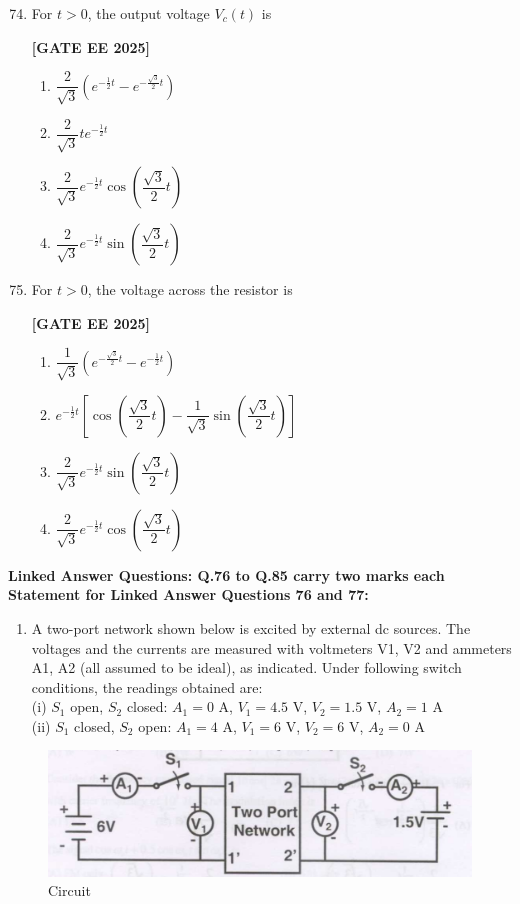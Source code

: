 \documentclass[12pt]{article}
\begin{document}
\begin{enumerate}[leftmargin=*, label=\textbf{Q.\arabic*:}]
\setcounter{enumi}{73}

\item For $t>0$, the output voltage $V_c(t)$ is
 
\noindent \textbf{[GATE EE 2025]}
\begin{enumerate}
  \item $\dfrac{2}{\sqrt{3}}\left(e^{-\frac{1}{2}t} - e^{-\frac{\sqrt{3}}{2}t}\right)$
  \item $\dfrac{2}{\sqrt{3}} t e^{-\frac{1}{2} t}$
  \item $\dfrac{2}{\sqrt{3}} e^{-\frac{1}{2} t} \cos\left( \dfrac{\sqrt{3}}{2} t \right)$
  \item $\dfrac{2}{\sqrt{3}} e^{-\frac{1}{2} t} \sin\left( \dfrac{\sqrt{3}}{2} t \right)$
\end{enumerate}

\item For $t>0$, the voltage across the resistor is
 
\noindent \textbf{[GATE EE 2025]}
\begin{enumerate}
  \item $\dfrac{1}{\sqrt{3}} \left( e^{-\frac{\sqrt{3}}{2} t} - e^{-\frac{1}{2} t} \right)$
  \item $e^{-\frac{1}{2} t} \left[ \cos \left( \dfrac{\sqrt{3}}{2} t \right) - \dfrac{1}{\sqrt{3}} \sin \left( \dfrac{\sqrt{3}}{2} t \right) \right]$
  \item $\dfrac{2}{\sqrt{3}} e^{-\frac{1}{2} t} \sin \left( \dfrac{\sqrt{3}}{2} t \right)$
  \item $\dfrac{2}{\sqrt{3}} e^{-\frac{1}{2} t} \cos \left( \dfrac{\sqrt{3}}{2} t \right)$
\end{enumerate}

\end{enumerate}


 \large \textbf {Linked Answer Questions: Q.76 to Q.85 carry two marks each}
 \large \textbf {Statement for Linked Answer Questions 76 and 77: }

\begin{enumerate}
\item A two-port network shown below is excited by external dc sources. The voltages and the currents are measured with voltmeters V1, V2 and ammeters A1, A2 (all assumed to be ideal), as indicated. Under following switch conditions, the readings obtained are: \\
(i) $S_1$ open, $S_2$ closed: $A_1=0$ A, $V_1=4.5$ V, $V_2=1.5$ V, $A_2=1$ A \\
(ii) $S_1$ closed, $S_2$ open: $A_1=4$ A, $V_1=6$ V, $V_2=6$ V, $A_2=0$ A
\end{enumerate}
\begin{figure}[H]\centering
\includegraphics[width=0.6\columnwidth]{figs/q7677.png}
\caption{Circuit}
\label{fig:q7677}
\end{figure}
\end{document}

